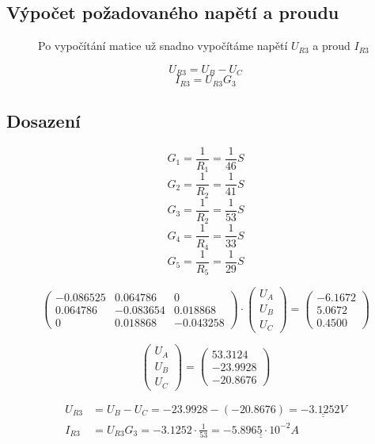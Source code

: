 \subsection{Výpočet požadovaného napětí a proudu}
\begin{figure}[H]
  Po vypočítání matice už snadno vypočítáme napětí $U_{R3}$ a proud $I_{R3}$

  $$ U_{R3} = U_B - U_C $$
  $$ I_{R3} = U_{R3} G_{3} $$
\end{figure}

\subsection{Dosazení}
\begin{figure}[H]

  $$ G_1 = \frac{1}{R_1} = \frac{1}{46} S $$
  $$ G_2 = \frac{1}{R_2} = \frac{1}{41} S $$
  $$ G_3 = \frac{1}{R_2} = \frac{1}{53} S$$
  $$ G_4 = \frac{1}{R_4} = \frac{1}{33} S$$
  $$ G_5 = \frac{1}{R_5} = \frac{1}{29} S$$

  $$
    \begin{pmatrix}
      -0.086525 & 0.064786  & 0         \\
      0.064786  & -0.083654 & 0.018868  \\
      0         & 0.018868  & -0.043258
    \end{pmatrix}
    \cdot
    \begin{pmatrix}
      U_A \\
      U_B \\
      U_C
    \end{pmatrix}
    =
    \begin{pmatrix}
      -6.1672 \\
      5.0672  \\
      0.4500
    \end{pmatrix}
  $$

  $$
    \begin{pmatrix}
      U_A \\
      U_B \\
      U_C
    \end{pmatrix}
    =
    \begin{pmatrix}
      53.3124  \\
      -23.9928 \\
      -20.8676
    \end{pmatrix}
  $$

  \begin{equation*}
    \begin{aligned}
      U_{R3} & = U_B - U_C = -23.9928 - (-20.8676) = \underline{\underline{-3.1252 V}}                       \\
      I_{R3} & = U_{R3} G_{3} = -3.1252 \cdot \frac{1}{53} = \underline{\underline{-5.8965 \cdot 10^{-2} A}}
    \end{aligned}
  \end{equation*}

\end{figure}

